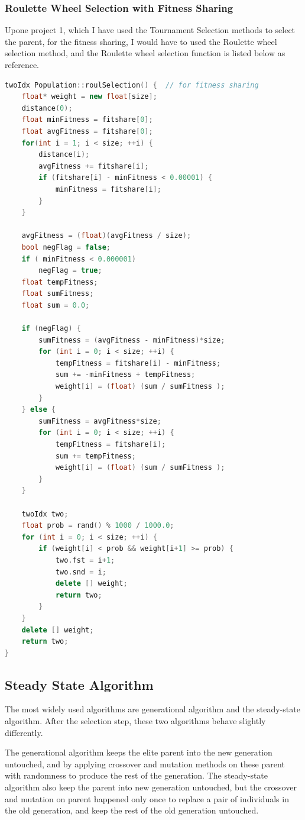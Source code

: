 \documentclass[10pt,b5paper]{article}
\begin{document}
\subsubsection{Roulette Wheel Selection with Fitness Sharing}
\label{sec-2-6-2}
Upone project 1, which I have used the Tournament Selection methods to select the parent, for the fitness sharing, I would have to used the Roulette wheel selection method, and the Roulette wheel selection function is listed below as reference. 
\begin{lstlisting}[language=c++]
twoIdx Population::roulSelection() {  // for fitness sharing
    float* weight = new float[size];
    distance(0);
    float minFitness = fitshare[0];
    float avgFitness = fitshare[0];
    for(int i = 1; i < size; ++i) {
        distance(i);
        avgFitness += fitshare[i]; 
        if (fitshare[i] - minFitness < 0.00001) {
            minFitness = fitshare[i];
        }
    }
    
    avgFitness = (float)(avgFitness / size);
    bool negFlag = false;
    if ( minFitness < 0.000001)
        negFlag = true;
    float tempFitness;
    float sumFitness;
    float sum = 0.0;

    if (negFlag) {
        sumFitness = (avgFitness - minFitness)*size;  
        for (int i = 0; i < size; ++i) {
            tempFitness = fitshare[i] - minFitness;
            sum += -minFitness + tempFitness;
            weight[i] = (float) (sum / sumFitness );
        }
    } else {
        sumFitness = avgFitness*size;
        for (int i = 0; i < size; ++i) {
            tempFitness = fitshare[i];
            sum += tempFitness;
            weight[i] = (float) (sum / sumFitness );
        }
    }

    twoIdx two;
    float prob = rand() % 1000 / 1000.0;
    for (int i = 0; i < size; ++i) {
        if (weight[i] < prob && weight[i+1] >= prob) {
            two.fst = i+1;
            two.snd = i;
            delete [] weight;
            return two;
        }
    }
    delete [] weight;
    return two;
}
\end{lstlisting}
\subsection{Steady State Algorithm}
\label{sec-2-7}
The most widely used algorithms are generational algorithm and the steady-state algorithm. After the selection step, these two algorithms behave slightly differently.

The generational algorithm keeps the elite parent into the new generation untouched, and by applying crossover and mutation methods on these parent with randomness to produce the rest of the generation. The steady-state algorithm also keep the parent into new generation untouched, but the crossover and mutation on parent happened only once to replace a pair of individuals in the old generation, and keep the rest of the old generation untouched.
\end{document}
